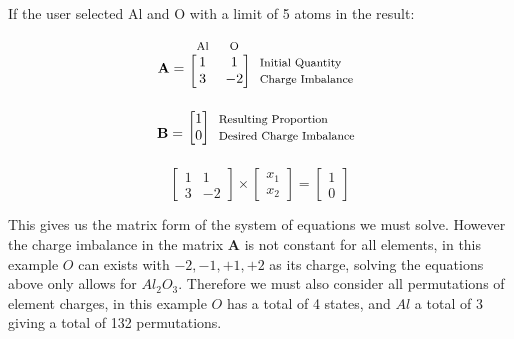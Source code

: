\documentclass[a4paper, 12pt]{article}
\begin{document}
\begin{center}
	If the user selected Al and O with a limit of 5 atoms in the result:
\end{center}
\begin{equation*}
	\mathbf{A}=
	\begin{blockarray}{*{2}{c} l}
		\begin{block}{*{2}{>{$\footnotesize}c<{$}} l}
			Al & O  \\
		\end{block}
		\begin{block}{[*{2}{c}]>{$\footnotesize}l<{$}}
			1 & 1 & Initial Quantity \\
			3 & -2 & Charge Imbalance \\
		\end{block}
	\end{blockarray}
\end{equation*}
\begin{equation*}
	\mathbf{B}=
		\begin{blockarray}{*{1}{c} l}
		\begin{block}{[*{1}{c}]>{$\footnotesize}l<{$}}
			1 &  Resulting Proportion \\
			0 &  Desired Charge Imbalance \\
		\end{block}
	\end{blockarray}
\end{equation*}
\begin{equation*}
	\begin{bmatrix}
	1 & 1 \\
	3 & -2
	\end{bmatrix}
	\times
	\begin{bmatrix}
	x_1 \\
	x_2
	\end{bmatrix}
	=
	\begin{bmatrix}
	1 \\
	0 
	\end{bmatrix}
\end{equation*}

\vspace*{0.5em}
This gives us the matrix form of the system of equations we must solve. However the charge imbalance in the matrix $\mathbf{A}$ is not constant for all elements, in this example $O$ can exists with $-2, -1, +1, +2$ as its charge, solving the equations above only allows for $Al_2O_3$. Therefore we must also consider all permutations of element charges, in this example $O$ has a total of 4 states, and $Al$ a total of 3 giving a total of 132 permutations. \\
\end{document}

